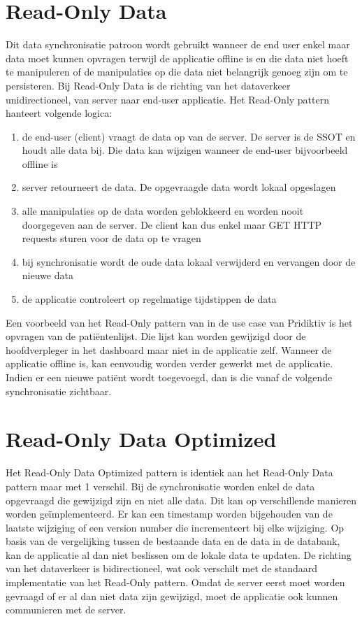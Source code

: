 \section{Read-Only Data}
Dit data synchronisatie patroon wordt gebruikt wanneer de end user enkel maar data moet kunnen opvragen terwijl de applicatie offline is en die data niet hoeft te manipuleren of de manipulaties op die data niet belangrijk genoeg zijn om te persisteren. Bij Read-Only Data is de richting van het dataverkeer unidirectioneel, van server naar end-user applicatie. Het Read-Only pattern hanteert volgende logica:
\begin{enumerate}
\item de end-user (client) vraagt de data op van de server. De server is de SSOT en houdt alle data bij. Die data kan wijzigen wanneer de end-user bijvoorbeeld offline is
\item server retourneert de data. De opgevraagde data wordt lokaal opgeslagen
\item alle manipulaties op de data worden geblokkeerd en worden nooit doorgegeven aan de server. De client kan dus enkel maar GET HTTP requests sturen voor de data op te vragen
\item bij synchronisatie wordt de oude data lokaal verwijderd en vervangen door de nieuwe data
\item de applicatie controleert op regelmatige tijdstippen de data
\end{enumerate}
Een voorbeeld van het Read-Only pattern van in de use case van Pridiktiv is het opvragen van de pati\"entenlijst. Die lijst kan worden gewijzigd door de hoofdverpleger in het dashboard maar niet in de applicatie zelf. Wanneer de applicatie offline is, kan eenvoudig worden verder gewerkt met de applicatie. Indien er een nieuwe pati\"ent wordt toegevoegd, dan is die vanaf de volgende synchronisatie zichtbaar.
\section{Read-Only Data Optimized}
Het Read-Only Data Optimized pattern is identiek aan het Read-Only Data pattern maar met 1 verschil. Bij de synchronisatie worden enkel de data opgevraagd die gewijzigd zijn en niet alle data. Dit kan op verschillende manieren worden ge\"implementeerd. Er kan een timestamp worden bijgehouden van de laatste wijziging of een version number die incrementeert bij elke wijziging. Op basis van de vergelijking tussen de bestaande data en de data in de databank, kan de applicatie al dan niet beslissen om de lokale data te updaten. De richting van het dataverkeer is bidirectioneel, wat ook verschilt met de standaard implementatie van het Read-Only pattern. Omdat de server eerst moet worden gevraagd of er al dan niet data zijn gewijzigd, moet de applicatie ook kunnen communieren met de server.
